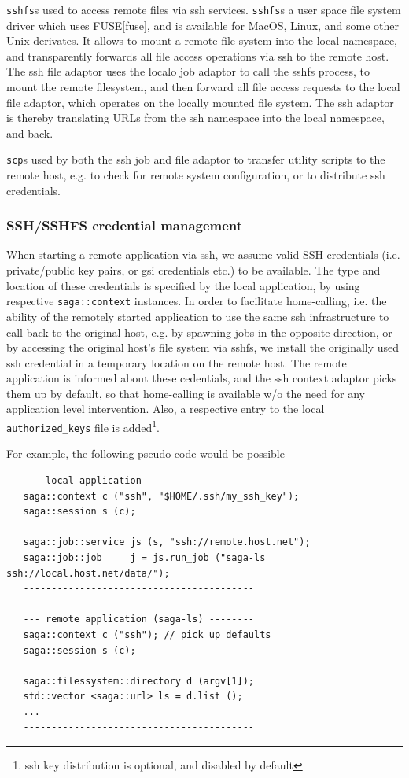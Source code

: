 \documentclass[conference,final]{IEEEtran}
\newcommand{\T}[1]{\texttt{#1}}
\newcommand{\scp}[1]{\texttt{scp}}
\newcommand{\sshfs}[1]{\texttt{sshfs}}
\begin{document}
  \sshfs is used to access remote files via ssh services.  \sshfs is a
  user space file system driver which uses FUSE\ref{fuse}, and is
  available for MacOS, Linux, and some other Unix derivates.  It
  allows to mount a remote file system into the local namespace, and
  transparently forwards all file access operations via ssh to the
  remote host.  The ssh file adaptor uses the localo job adaptor to
  call the sshfs process, to mount the remote filesystem, and then
  forward all file access requests to the local file adaptor, which
  operates on the locally mounted file system.  The ssh adaptor is
  thereby translating URLs from the ssh namespace into the local
  namespace, and back.

  \scp is used by both the ssh job and file adaptor to transfer
  utility scripts to the remote host, e.g. to check for remote system
  configuration, or to distribute ssh credentials.

  
  \subsubsection{SSH/SSHFS credential management}

   When starting a remote application via ssh, we assume valid SSH
   credentials (i.e. private/public key pairs, or gsi credentials
   etc.) to be available.  The type and location of these credentials
   is specified by the local application, by using respective
   \T{saga::context} instances.  In order to facilitate home-calling,
   i.e. the ability of the remotely started application to use the
   same ssh infrastructure to call back to the original host, e.g. by
   spawning jobs in the opposite direction, or by accessing the
   original host's file system via sshfs, we install the originally
   used ssh credential in a temporary location on the remote host.
   The remote application is informed about these cedentials, and the
   ssh context adaptor picks them up by default, so that home-calling
   is available w/o the need for any application level intervention.
   Also, a respective entry to the local \T{authorized\_keys} file is
   added\footnote{ssh key distribution is optional, and disabled by
   default}.

   For example, the following pseudo code would be possible

   \begin{verbatim}
   --- local application -------------------
   saga::context c ("ssh", "$HOME/.ssh/my_ssh_key");
   saga::session s (c);

   saga::job::service js (s, "ssh://remote.host.net");
   saga::job::job     j = js.run_job ("saga-ls ssh://local.host.net/data/");
   -----------------------------------------

   --- remote application (saga-ls) --------
   saga::context c ("ssh"); // pick up defaults
   saga::session s (c);

   saga::filessystem::directory d (argv[1]);
   std::vector <saga::url> ls = d.list ();
   ...
   -----------------------------------------
\end{verbatim}
\end{document}
